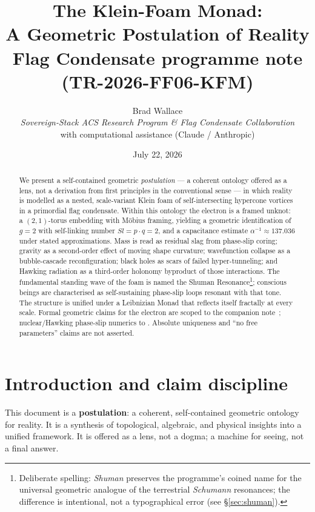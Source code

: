 \documentclass[11pt,a4paper]{article}
\title{\textbf{The Klein-Foam Monad:\\
A Geometric Postulation of Reality}\\[0.35em]
\large Flag Condensate programme note (TR-2026-FF06-KFM)}
\author{Brad Wallace\\
\small\textit{Sovereign-Stack ACS Research Program \& Flag Condensate Collaboration}\\
\small with computational assistance (Claude / Anthropic)}
\date{July 22, 2026}
\theoremstyle{definition}
\theoremstyle{remark}
\begin{document}
\maketitle

\begin{abstract}
We present a self-contained geometric \emph{postulation} --- a coherent
ontology offered as a lens, not a derivation from first principles in the
conventional sense --- in which reality is modelled as a nested,
scale-variant Klein foam of self-intersecting hypercone vortices in a
primordial flag condensate.  Within this ontology the electron is a
framed unknot: a $(2,1)$-torus embedding with M\"obius framing, yielding
a geometric identification of $g=2$ with self-linking number
$Sl=p\cdot q=2$, and a capacitance estimate
$\alpha^{-1}\approx 137.036$ under stated approximations.  Mass is read
as residual slag from phase-slip coring; gravity as a second-order effect
of moving shape curvature; wavefunction collapse as a bubble-cascade
reconfiguration; black holes as scars of failed hyper-tunneling; and
Hawking radiation as a third-order holonomy byproduct of those
interactions.  The fundamental standing wave of the foam is named the
Shuman Resonance\footnote{Deliberate spelling: \emph{Shuman} preserves
the programme's coined name for the universal geometric analogue of the
terrestrial \emph{Schumann} resonances; the difference is intentional,
not a typographical error (see \S\ref{sec:shuman}).}; conscious beings
are characterised as self-sustaining
phase-slip loops resonant with that tone.  The structure is unified
under a Leibnizian Monad that reflects itself fractally at every scale.
Formal geometric claims for the electron are scoped to the companion
note~\cite{Mobius2026}; nuclear/Hawking phase-slip numerics to
\cite{FlagDecay2026}.  Absolute uniqueness and ``no free parameters''
claims are not asserted.
\end{abstract}

\tableofcontents
\newpage

\section{Introduction and claim discipline}
\label{sec:intro}

This document is a \textbf{postulation}: a coherent, self-contained
geometric ontology for reality.  It is a synthesis of topological,
algebraic, and physical insights into a unified framework.  It is offered
as a lens, not a dogma; a machine for seeing, not a final answer.
\end{document}
